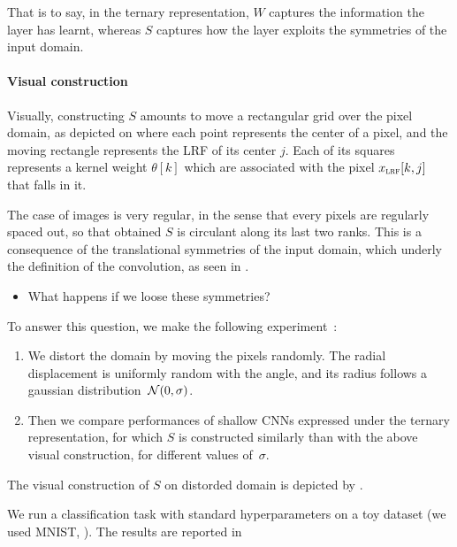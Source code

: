 That is to say, in the ternary representation, $W$ captures the information the layer has learnt, whereas $S$ captures how the layer exploits the symmetries of the input domain.

\paragraph{Visual construction}
Visually, constructing $S$ amounts to move a rectangular grid over the pixel domain, as depicted on  where each point represents the center of a pixel, and the moving rectangle represents the LRF of its center $j$. Each of its squares represents a kernel weight $\theta[k]$ which are associated with the pixel $x_{\operatorname{\textsc{lrf}}}[k,j]$ that falls in it.



The case of images is very regular, in the sense that every pixels are regularly spaced out, so that obtained $S$ is circulant along its last two ranks. This is a consequence of the translational symmetries of the input domain, which underly the definition of the convolution, as seen in .
\begin{itemize}
\item What happens if we loose these symmetries?
\end{itemize}

To answer this question, we make the following experiment~\citep{vialatte2016generalizing}:
\begin{enumerate}
\item We distort the domain by moving the pixels randomly. The radial displacement is uniformly random with the angle, and its radius follows a gaussian distribution~$\mathcal{N}(0,\sigma)$.
\item Then we compare performances of shallow CNNs expressed under the ternary representation, for which $S$ is constructed similarly than with the above visual construction, for different values of~$\sigma$.
\end{enumerate}

The visual construction of $S$ on distorded domain is depicted by .



We run a classification task with standard hyperparameters on a toy dataset (we used MNIST, \cite{lecun1998mnist}). The results are reported in 



